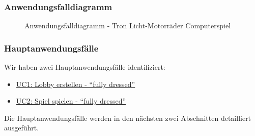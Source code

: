 \documentclass[11pt,ngerman]{article}
\newcommand{\quotes}[1]{``#1''}
\begin{document}
    \subsubsection{Anwendungsfalldiagramm}
    \begin{figure}[H]
    	\centering
    	\caption{Anwendungsfalldiagramm - Tron Licht-Motorräder Computerspiel}
    	\label{fig:UseCaseDiagram}
    \end{figure}

    \subsubsection{Hauptanwendungsfälle}
    \label{ssec:Hauptanwendungsfaelle}
    Wir haben zwei Hauptanwendungsfälle identifiziert:
    \begin{itemize}
    	\item  \hyperref[ssec:UC1Lobbyerstellen]{UC1: Lobby erstellen - \quotes{fully dressed}}
    	\item\hyperref[ssec:UC2Spielspielen]{UC2: Spiel spielen - \quotes{fully dressed}}
    \end{itemize}
    Die Hauptanwendungsfälle werden in den nächsten zwei Abschnitten detailliert ausgeführt.
\end{document}
